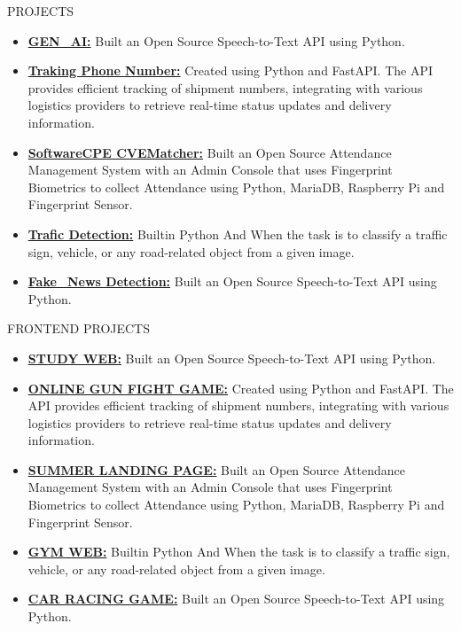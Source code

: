 \documentclass{resume}
\begin{document}
\begin{rSection}{PROJECTS}
    \begin{itemize}
        \item \textbf{\href{https://github.com/trishaamandal/Gen-AI}{GEN\_AI:}} {Built an Open Source Speech-to-Text API using Python.}
        \item \textbf{\href{https://github.com/trishaamandal/tracking_number}{Traking Phone Number:}} {Created using Python and FastAPI. The API provides efficient tracking of shipment numbers, integrating with various logistics providers to retrieve real-time status updates and delivery information.}
        \item \textbf{\href{https://github.com/trishaamandal/SoftwareCPE-CVE}{SoftwareCPE CVEMatcher:}} {Built an Open Source Attendance Management System with an Admin Console that uses Fingerprint Biometrics to collect Attendance using Python, MariaDB, Raspberry Pi and Fingerprint Sensor.}
        \item \textbf{\href{https://github.com/trishaamandal/Trafic_Detection}{Trafic Detection:}} {Builtin Python And When the task is to classify a traffic sign, vehicle, or any road-related object from a given image.}
        \item \textbf{\href{https://github.com/trishaamandal/fakenews_detection}{Fake\_News Detection:}} {Built an Open Source Speech-to-Text API using Python.}

    \end{itemize}
\end{rSection}
\vspace{-0.4em}

\begin{rSection}{ FRONTEND PROJECTS}
    \begin{itemize}
        \item \textbf{\href{https://github.com/trishaamandal/CD-studiesPlans}{STUDY WEB:}} {Built an Open Source Speech-to-Text API using Python.}
        \item \textbf{\href{https://github.com/trishaamandal/gameweb}{ONLINE GUN FIGHT GAME:}} {Created using Python and FastAPI. The API provides efficient tracking of shipment numbers, integrating with various logistics providers to retrieve real-time status updates and delivery information.}
        \item \textbf{\href{https://github.com/trishaamandal/landingpage_summer}{SUMMER LANDING PAGE:}} {Built an Open Source Attendance Management System with an Admin Console that uses Fingerprint Biometrics to collect Attendance using Python, MariaDB, Raspberry Pi and Fingerprint Sensor.}
        \item \textbf{\href{https://github.com/trishaamandal/GYM-group}{GYM WEB:}} {Builtin Python And When the task is to classify a traffic sign, vehicle, or any road-related object from a given image.}
        \item \textbf{\href{https://github.com/trishaamandal/car_racing}{CAR RACING GAME:}} {Built an Open Source Speech-to-Text API using Python.}

    \end{itemize}
\end{rSection}
\vspace{-0.4em}
\end{document}
